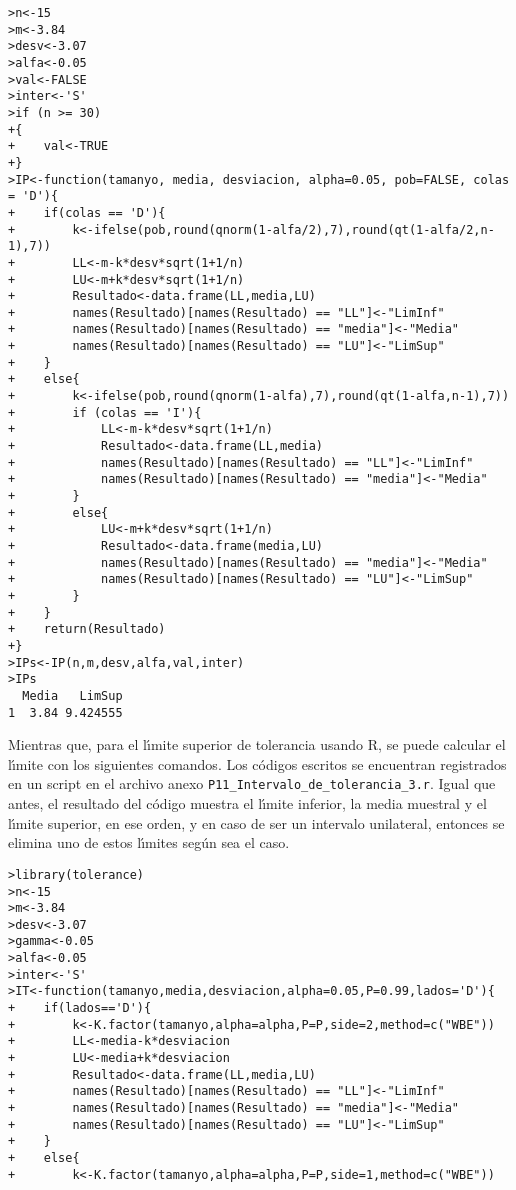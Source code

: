 \begin{solucion}
 \begin{verbatim}
>n<-15
>m<-3.84
>desv<-3.07
>alfa<-0.05
>val<-FALSE
>inter<-'S'
>if (n >= 30)
+{
+    val<-TRUE
+}
>IP<-function(tamanyo, media, desviacion, alpha=0.05, pob=FALSE, colas = 'D'){
+    if(colas == 'D'){
+        k<-ifelse(pob,round(qnorm(1-alfa/2),7),round(qt(1-alfa/2,n-1),7))
+        LL<-m-k*desv*sqrt(1+1/n)
+        LU<-m+k*desv*sqrt(1+1/n)
+        Resultado<-data.frame(LL,media,LU)
+        names(Resultado)[names(Resultado) == "LL"]<-"LimInf"
+        names(Resultado)[names(Resultado) == "media"]<-"Media"
+        names(Resultado)[names(Resultado) == "LU"]<-"LimSup"
+    }
+    else{
+        k<-ifelse(pob,round(qnorm(1-alfa),7),round(qt(1-alfa,n-1),7))
+        if (colas == 'I'){
+            LL<-m-k*desv*sqrt(1+1/n)
+            Resultado<-data.frame(LL,media)
+            names(Resultado)[names(Resultado) == "LL"]<-"LimInf"
+            names(Resultado)[names(Resultado) == "media"]<-"Media"
+        }
+        else{
+            LU<-m+k*desv*sqrt(1+1/n)
+            Resultado<-data.frame(media,LU)
+            names(Resultado)[names(Resultado) == "media"]<-"Media"
+            names(Resultado)[names(Resultado) == "LU"]<-"LimSup"
+        }
+    }
+    return(Resultado)
+}
>IPs<-IP(n,m,desv,alfa,val,inter)
>IPs
  Media   LimSup
1  3.84 9.424555
 \end{verbatim}
 \vspace{-0.5cm}
 Mientras que, para el l\'{\i}mite superior de tolerancia usando R, se puede calcular el l\'{\i}mite con los siguientes comandos. Los c\'odigos escritos se encuentran registrados en un script en el archivo anexo \texttt{P11\_Intervalo\_de\_tolerancia\_3.r}. Igual que antes, el resultado del c\'odigo muestra el l\'{\i}mite inferior, la media muestral y el l\'{\i}mite superior, en ese orden, y en caso de ser un intervalo unilateral, entonces se elimina uno de estos l\'{\i}mites seg\'un sea el caso.
 \begin{verbatim}
>library(tolerance)
>n<-15
>m<-3.84
>desv<-3.07
>gamma<-0.05
>alfa<-0.05
>inter<-'S'
>IT<-function(tamanyo,media,desviacion,alpha=0.05,P=0.99,lados='D'){
+    if(lados=='D'){
+        k<-K.factor(tamanyo,alpha=alpha,P=P,side=2,method=c("WBE"))
+        LL<-media-k*desviacion
+        LU<-media+k*desviacion
+        Resultado<-data.frame(LL,media,LU)
+        names(Resultado)[names(Resultado) == "LL"]<-"LimInf"
+        names(Resultado)[names(Resultado) == "media"]<-"Media"
+        names(Resultado)[names(Resultado) == "LU"]<-"LimSup"
+    }
+    else{
+        k<-K.factor(tamanyo,alpha=alpha,P=P,side=1,method=c("WBE"))

\end{verbatim}
\end{solucion}
